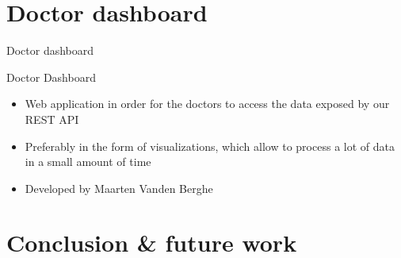 \documentclass[english]{beamer}
\begin{document}
\section{Doctor dashboard}
\begin{frame}{Doctor dashboard}
	\centering
	\begin{figure}
	\end{figure}
\end{frame}
\begin{frame}{Doctor Dashboard}
	\begin{itemize}
		\item Web application in order for the doctors to access the data exposed by our REST API \\
		\item Preferably in the form of visualizations, which allow to process a lot of data in a small amount of time
		\item Developed by Maarten Vanden Berghe
	\end{itemize}
%	
%	
%	
\end{frame}
\section{Conclusion \& future work}
\end{document}

